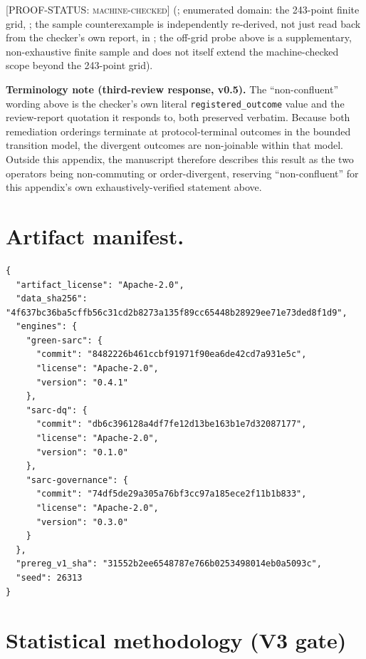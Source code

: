 \documentclass[11pt,a4paper]{article}
\theoremstyle{definition}
\newcommand{\proofstatus}[1]{[\textsc{PROOF-STATUS}: \textsc{#1}]}
\begin{document}
\proofstatus{machine-checked} (; enumerated domain: the 243-point finite grid, ; the sample counterexample is independently re-derived, not just read back from the checker's own report, in ; the off-grid probe above is a supplementary, non-exhaustive finite sample and does not itself extend the machine-checked scope beyond the 243-point grid).

\noindent\textbf{Terminology note (third-review response, v0.5).} The ``non-confluent'' wording above is the checker's own literal \texttt{registered\_outcome} value and the review-report quotation it responds to, both preserved verbatim. Because both remediation orderings terminate at protocol-terminal outcomes in the bounded transition model, the divergent outcomes are non-joinable within that model. Outside this appendix, the manuscript therefore describes this result as the two operators being non-commuting or order-divergent, reserving ``non-confluent'' for this appendix's own exhaustively-verified statement above.

\section{Artifact manifest.}
\label{app:manifest}

\small
\begin{verbatim}
{
  "artifact_license": "Apache-2.0",
  "data_sha256": "4f637bc36ba5cffb56c31cd2b8273a135f89cc65448b28929ee71e73ded8f1d9",
  "engines": {
    "green-sarc": {
      "commit": "8482226b461ccbf91971f90ea6de42cd7a931e5c",
      "license": "Apache-2.0",
      "version": "0.4.1"
    },
    "sarc-dq": {
      "commit": "db6c396128a4df7fe12d13be163b1e7d32087177",
      "license": "Apache-2.0",
      "version": "0.1.0"
    },
    "sarc-governance": {
      "commit": "74df5de29a305a76bf3cc97a185ece2f11b1b833",
      "license": "Apache-2.0",
      "version": "0.3.0"
    }
  },
  "prereg_v1_sha": "31552b2ee6548787e766b0253498014eb0a5093c",
  "seed": 26313
}
\end{verbatim}
\normalsize

\section{Statistical methodology (V3 gate)}
\label{app:statistical-methodology}
\end{document}
